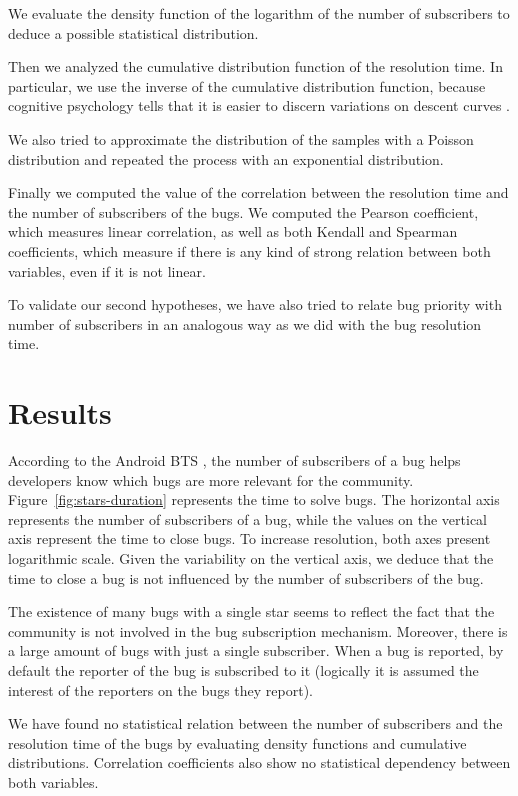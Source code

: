 \documentclass[10pt, conference, compsocconf]{IEEEtran}
\begin{document}
We evaluate the density function of the logarithm of the number of subscribers to deduce a possible statistical distribution.  

Then we analyzed the cumulative distribution function of the resolution time. In particular, we use the inverse of the cumulative distribution function, because cognitive psychology tells that it is easier to discern variations on descent curves  \cite{NowYouSeeIt}.

We also tried to approximate the distribution of the samples with a Poisson distribution and repeated the process with an exponential distribution.

Finally we computed the value of the correlation between the resolution time and the number of subscribers of the bugs. We computed the Pearson coefficient, which measures linear correlation, as well as both Kendall and Spearman coefficients, which measure if there is any kind of strong relation between both variables, even if it is not linear.

To validate our second hypotheses, we have also tried to relate bug priority with number of subscribers in an analogous way as we did with the bug resolution time.

\section{Results}
\label{sec:results}
According to the Android BTS \cite{ReportBugs}, the number of subscribers of a bug helps developers know which bugs are more relevant for the community. Figure~\ref{fig:stars-duration} represents the time to solve bugs. The horizontal axis represents the number of subscribers of a bug, while the values on the vertical axis represent the time to close bugs. To increase resolution, both axes present logarithmic scale. Given the variability on the vertical axis, we deduce that the time to close a bug is not influenced by the number of subscribers of the bug.


The existence of many bugs with a single star seems to reflect the fact that the community is not involved in the bug subscription mechanism. Moreover, there is a large amount of bugs with just a single subscriber. When a bug is reported, by default the reporter of the bug is subscribed to it (logically it is assumed the interest of the reporters on the bugs they report). 

We have found no statistical relation between the number of subscribers and the resolution time of the bugs by evaluating density functions and cumulative distributions. Correlation coefficients also show no statistical dependency between both variables.
\end{document}
